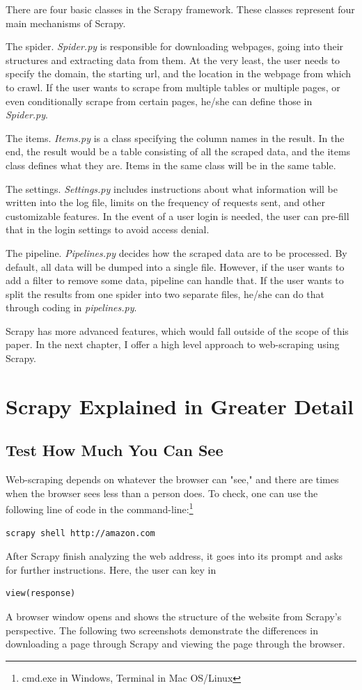\documentclass[12pt]{report}
\begin{document}
There are four basic classes in the Scrapy framework. These classes represent four main mechanisms of Scrapy. 

The spider. \textit{Spider.py} is responsible for downloading webpages, going into their structures and extracting data from them. At the very least, the user needs to specify the domain, the starting url, and the location in the webpage from which to crawl. If the user wants to scrape from multiple tables or multiple pages, or even conditionally scrape from certain pages, he/she can define those in \textit{Spider.py}.

The items. \textit{Items.py} is a class specifying the column names in the result. In the end, the result would be a table consisting of all the scraped data, and the items class defines what they are. Items in the same class will be in the same table.

The settings. \textit{Settings.py} includes instructions about what information will be written into the log file, limits on the frequency of requests sent, and other customizable features. In the event of a user login is needed, the user can pre-fill that in the login settings to avoid access denial.

The pipeline. \textit{Pipelines.py} decides how the scraped data are to be processed. By default, all data will be dumped into a single file. However, if the user wants to add a filter to remove some data, pipeline can handle that. If the user wants to split the results from one spider into two separate files, he/she can do that through coding in \textit{pipelines.py}.

Scrapy has more advanced features, which would fall outside of the scope of this paper. In the next chapter, I offer a high level approach to web-scraping using Scrapy.

\chapter{Scrapy Explained in Greater Detail}

\section{Test How Much You Can See}
Web-scraping depends on whatever the browser can "see," and there are times when the browser sees less than a person does. To check, one can use the following line of code in the command-line:\footnote{cmd.exe in Windows, Terminal in Mac OS/Linux} 
\begin{lstlisting}
scrapy shell http://amazon.com
\end{lstlisting}
After Scrapy finish analyzing the web address, it goes into its prompt and asks for further instructions. Here, the user can key in 
\begin{lstlisting}
view(response)
\end{lstlisting} 
A browser window opens and shows the structure of the website from Scrapy's perspective. The following two screenshots demonstrate the differences in downloading a page through Scrapy and viewing the page through the browser. 
\end{document}
